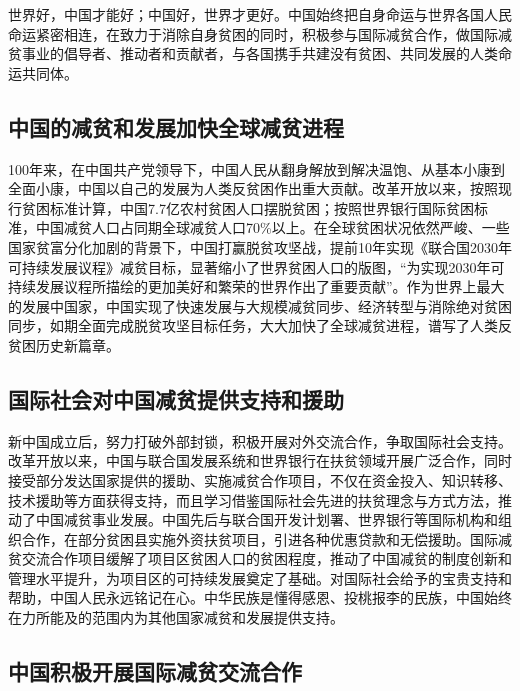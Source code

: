 \documentclass{ctexart}
\begin{document}
世界好，中国才能好；中国好，世界才更好。中国始终把自身命运与世界各国人民命运紧密相连，在致力于消除自身贫困的同时，积极参与国际减贫合作，做国际减贫事业的倡导者、推动者和贡献者，与各国携手共建没有贫困、共同发展的人类命运共同体。

\subsection{中国的减贫和发展加快全球减贫进程}

100年来，在中国共产党领导下，中国人民从翻身解放到解决温饱、从基本小康到全面小康，中国以自己的发展为人类反贫困作出重大贡献。改革开放以来，按照现行贫困标准计算，中国7.7亿农村贫困人口摆脱贫困；按照世界银行国际贫困标准，中国减贫人口占同期全球减贫人口70\%以上。在全球贫困状况依然严峻、一些国家贫富分化加剧的背景下，中国打赢脱贫攻坚战，提前10年实现《联合国2030年可持续发展议程》减贫目标，显著缩小了世界贫困人口的版图，“为实现2030年可持续发展议程所描绘的更加美好和繁荣的世界作出了重要贡献”。作为世界上最大的发展中国家，中国实现了快速发展与大规模减贫同步、经济转型与消除绝对贫困同步，如期全面完成脱贫攻坚目标任务，大大加快了全球减贫进程，谱写了人类反贫困历史新篇章。

\subsection{国际社会对中国减贫提供支持和援助}

新中国成立后，努力打破外部封锁，积极开展对外交流合作，争取国际社会支持。改革开放以来，中国与联合国发展系统和世界银行在扶贫领域开展广泛合作，同时接受部分发达国家提供的援助、实施减贫合作项目，不仅在资金投入、知识转移、技术援助等方面获得支持，而且学习借鉴国际社会先进的扶贫理念与方式方法，推动了中国减贫事业发展。中国先后与联合国开发计划署、世界银行等国际机构和组织合作，在部分贫困县实施外资扶贫项目，引进各种优惠贷款和无偿援助。国际减贫交流合作项目缓解了项目区贫困人口的贫困程度，推动了中国减贫的制度创新和管理水平提升，为项目区的可持续发展奠定了基础。对国际社会给予的宝贵支持和帮助，中国人民永远铭记在心。中华民族是懂得感恩、投桃报李的民族，中国始终在力所能及的范围内为其他国家减贫和发展提供支持。

\subsection{中国积极开展国际减贫交流合作}
\end{document}
